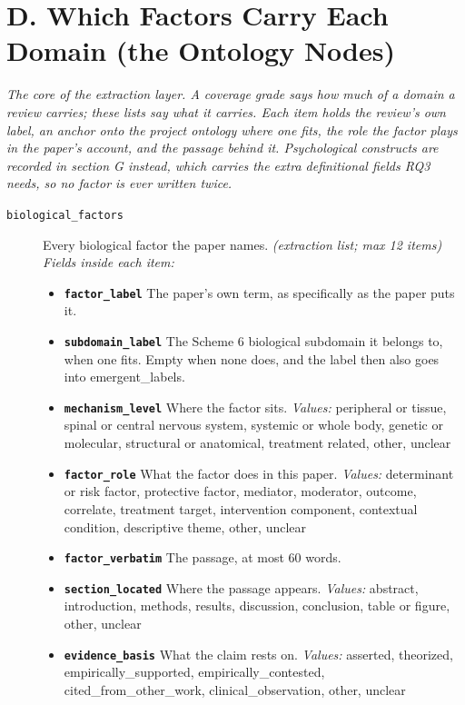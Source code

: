 \documentclass[11pt]{article}
\begin{document}
\section*{D. Which Factors Carry Each Domain (the Ontology Nodes)}
{\small\itshape The core of the extraction layer. A coverage grade says how much of a domain a review carries; these lists say what it carries. Each item holds the review's own label, an anchor onto the project ontology where one fits, the role the factor plays in the paper's account, and the passage behind it. Psychological constructs are recorded in section G instead, which carries the extra definitional fields RQ3 needs, so no factor is ever written twice.}\par\smallskip
\begin{description}
\item[\texttt{biological\_factors}] Every biological factor the paper names. \textit{(extraction list; max 12 items)}
  {\small\itshape Fields inside each item:}
  \begin{itemize}[leftmargin=1.3em,itemsep=1pt,topsep=2pt]
  \item \textbf{\texttt{factor\_label}} The paper's own term, as specifically as the paper puts it.
  \item \textbf{\texttt{subdomain\_label}} The Scheme 6 biological subdomain it belongs to, when one fits. Empty when none does, and the label then also goes into emergent\_labels.
  \item \textbf{\texttt{mechanism\_level}} Where the factor sits. {\small \textit{Values:} peripheral or tissue, spinal or central nervous system, systemic or whole body, genetic or molecular, structural or anatomical, treatment related, other, unclear}
  \item \textbf{\texttt{factor\_role}} What the factor does in this paper. {\small \textit{Values:} determinant or risk factor, protective factor, mediator, moderator, outcome, correlate, treatment target, intervention component, contextual condition, descriptive theme, other, unclear}
  \item \textbf{\texttt{factor\_verbatim}} The passage, at most 60 words.
  \item \textbf{\texttt{section\_located}} Where the passage appears. {\small \textit{Values:} abstract, introduction, methods, results, discussion, conclusion, table or figure, other, unclear}
  \item \textbf{\texttt{evidence\_basis}} What the claim rests on. {\small \textit{Values:} asserted, theorized, empirically\_supported, empirically\_contested, cited\_from\_other\_work, clinical\_observation, other, unclear}

\end{itemize}
\end{description}
\end{document}
